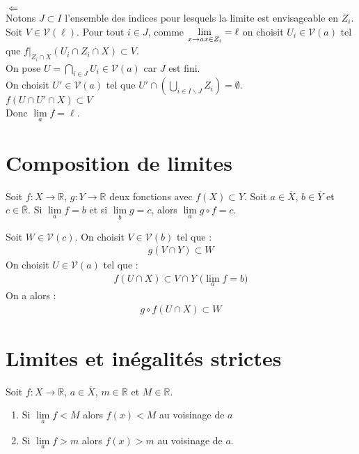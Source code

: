\documentclass[../main.tex]{subfiles}
\begin{document}
$\boxed{\Leftarrow}$ \\
Notons $J \subset I$ l'ensemble des indices pour lesquels la limite est envisageable en $Z_i$. \\
Soit $V \in \mathcal{V}(\ell)$. Pour tout $i \in J$, comme $\lim\limits_{x \to a \\ x \in Z_i} = \ell$ on choisit $U_i \in \mathcal{V}(a)$ tel que $\left. f \right|_{Z_i \cap X} (U_i \cap Z_i \cap X) \subset V$. \\
On pose $U = \bigcap\limits_{i \in J} U_i \in \mathcal{V}(a)$ car $J$ est fini. \\
On choisit $U' \in \mathcal{V}(a)$ tel que $U' \cap \left(\bigcup\limits_{i \in I \backslash J} Z_i \right) = \emptyset$. \\
$f(U \cap U' \cap X) \subset V$ \\
Donc $\boxed{\lim\limits_a f = \ell}$. 

\setcounter{section}{29}
\section{Composition de limites}
\begin{tcolorbox}[title=Propostion 15.30, title filled=false, colframe=lightblue, colback=lightblue!10!white]
    Soit $f:X\to \mathbb{R}$, $g:Y\to \mathbb{R}$ deux fonctions avec $f(X) \subset Y$. Soit $a \in \overline{X}$, $b \in \overline{Y}$ et $c \in \overline{\mathbb{R}}$. Si $\lim\limits_a f = b$ et si $\lim\limits_b g = c$, alors $\lim\limits_a g \circ f = c$. 
\end{tcolorbox}

Soit $W \in \mathcal{V}(c)$. On choisit $V \in \mathcal{V}(b)$ tel que : 
\begin{align*}
    g(V \cap Y) \subset W
\end{align*}
On choisit $U \in \mathcal{V}(a)$ tel que : 
\begin{align*}
    f(U \cap X) \subset V \cap Y \text{ ($\lim\limits_a f = b$)}
\end{align*}
On a alors : 
\begin{align*}
    \boxed{g \circ f(U \cap X) \subset W}
\end{align*}

\setcounter{section}{31}
\section{Limites et inégalités strictes}
\begin{tcolorbox}[title=Propostion 15.32, title filled=false, colframe=lightblue, colback=lightblue!10!white]
    Soit $f:X \to \mathbb{R}$, $a \in \overline{X}$, $m \in \mathbb{R}$ et $M \in \mathbb{R}$. 
    \begin{enumerate}
        \item Si $\lim\limits_a f < M$ alors $f(x) < M$ au voisinage de $a$ 
        \item Si $\lim\limits_a f > m$ alors $f(x) > m$ au voisinage de $a$. 
    \end{enumerate}
\end{tcolorbox}
\end{document}
